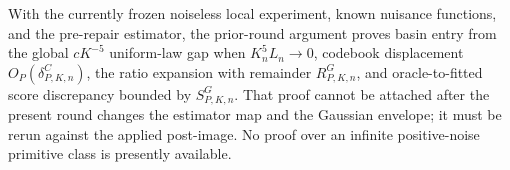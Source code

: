 With the currently frozen noiseless local experiment, known nuisance functions, and the pre-repair estimator, the prior-round argument proves basin entry from the global \(cK^{-5}\) uniform-law gap when \(K_n^5L_n\to0\), codebook displacement \(O_P(\delta^C_{P,K,n})\), the ratio expansion with remainder \(R^G_{P,K,n}\), and oracle-to-fitted score discrepancy bounded by \(S^G_{P,K,n}\).  That proof cannot be attached after the present round changes the estimator map and the Gaussian envelope; it must be rerun against the applied post-image.  No proof over an infinite positive-noise primitive class is presently available.
